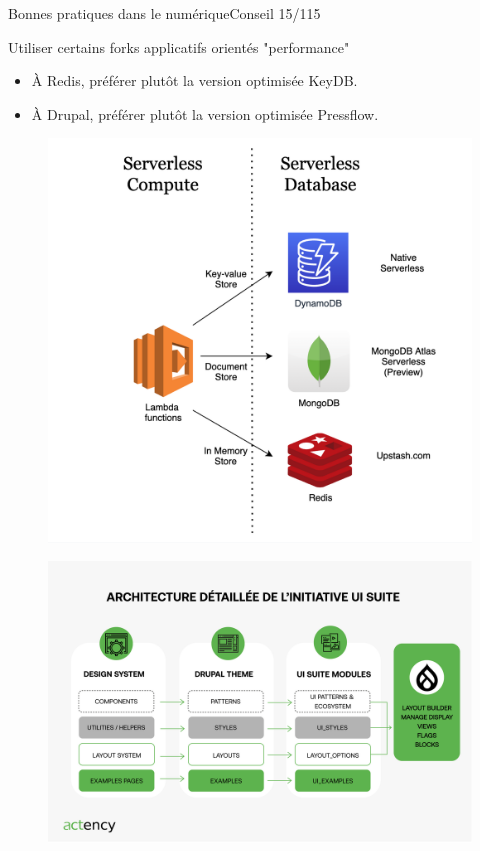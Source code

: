 \begin{frame}{Bonnes pratiques dans le numérique}{Conseil 15/115}

\begin{block}{Utiliser certains forks applicatifs orientés "performance"}

\begin{itemize}
    \item À Redis, préférer plutôt la version optimisée KeyDB.
    \item À Drupal, préférer plutôt la version optimisée Pressflow.
\end{itemize}
\end{block}


\begin{minipage}[b]{0.4\linewidth}  
\begin{figure}
    \includegraphics[scale=0.1]{chapitre2/wdd2/fig/redis.png}
    \centering
\end{figure}
\end{minipage}\hfill
\begin{minipage}[b]{0.6\linewidth}  
\begin{figure}
    \centering
    \includegraphics[scale=0.07]{chapitre2/wdd2/fig/drupal.jpg}

\end{figure}
\end{minipage}
\end{frame}
